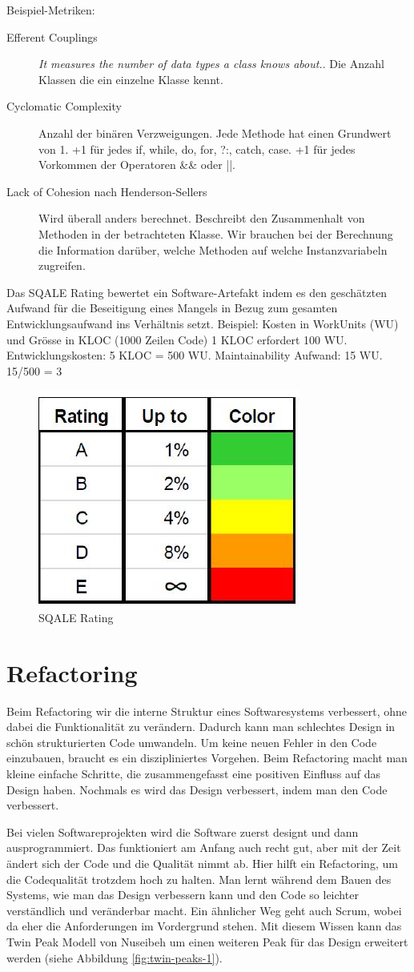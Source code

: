 Beispiel-Metriken:
\begin{description}
	\item[Efferent Couplings] \textit{It measures the number of data types a class knows about.}. Die Anzahl Klassen die ein einzelne Klasse kennt.
	
	\item[Cyclomatic Complexity] Anzahl der binären Verzweigungen. Jede Methode hat einen Grundwert von 1. +1 für jedes if, while, do, for, ?:, catch, case. +1 für jedes Vorkommen der Operatoren \&\& oder ||.
	
	\item[Lack of Cohesion nach Henderson-Sellers] Wird überall anders berechnet. Beschreibt den Zusammenhalt von Methoden in der betrachteten Klasse. Wir brauchen bei der Berechnung die Information darüber, welche Methoden auf welche Instanzvariabeln zugreifen.
\end{description}

Das SQALE Rating bewertet ein Software-Artefakt indem es den geschätzten Aufwand für die Beseitigung eines Mangels in Bezug zum gesamten Entwicklungsaufwand ins Verhältnis setzt. Beispiel: Kosten in WorkUnits (WU) und Grösse in KLOC (1000 Zeilen Code) 1 KLOC erfordert 100 WU. Entwicklungskosten: 5 KLOC = 500 WU. Maintainability Aufwand: 15 WU. 15/500 = 3%

\begin{figure}[h!]
\centering
\includegraphics[width=0.1\linewidth]{fig/sqale-rating}
\caption{SQALE Rating}
\label{fig:sqale-rating}
\end{figure}

\section{Refactoring}

Beim Refactoring wir die interne Struktur eines Softwaresystems verbessert, ohne dabei die Funktionalität zu verändern. Dadurch kann man schlechtes Design in schön strukturierten Code umwandeln. Um keine neuen Fehler in den Code einzubauen, braucht es ein diszipliniertes Vorgehen. Beim Refactoring macht man kleine einfache Schritte, die zusammengefasst eine positiven Einfluss auf das Design haben. Nochmals es wird das Design verbessert, indem man den Code verbessert.

Bei vielen Softwareprojekten wird die Software zuerst designt und dann ausprogrammiert. Das funktioniert am Anfang auch recht gut, aber mit der Zeit ändert sich der Code und die Qualität nimmt ab. Hier hilft ein Refactoring, um die Codequalität trotzdem hoch zu halten. Man lernt während dem Bauen des Systems, wie man das Design verbessern kann und den Code so leichter verständlich und veränderbar macht. Ein ähnlicher Weg geht auch Scrum, wobei da eher die Anforderungen im Vordergrund stehen. Mit diesem Wissen kann das Twin Peak Modell von Nuseibeh um einen weiteren Peak für das Design erweitert werden (siehe Abbildung \ref{fig:twin-peaks-1}).

